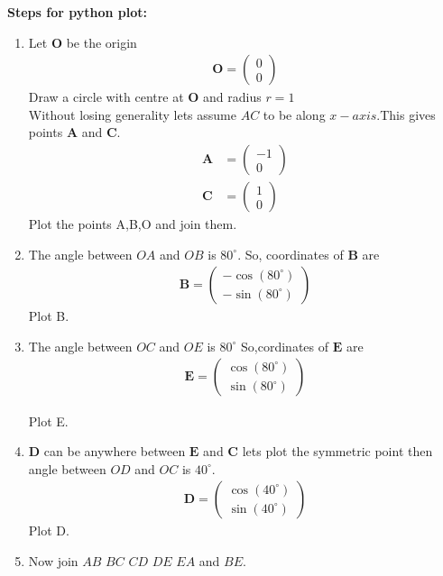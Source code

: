 \documentclass[journal,12pt,twocolumn]{IEEEtran}
\let\vec\mathbf
\newcommand{\myvec}[1]{\ensuremath{\begin{pmatrix}#1\end{pmatrix}}}
\begin{document}
\textbf{Steps for python plot:\\}
\begin{enumerate}
    \item Let $\vec{O}$ be the origin \\ 
              \begin{align}
               \vec{O}=\myvec{0\\0}
               \end{align}
               Draw a circle with centre at $\vec{O}$ and radius $r=1$\\
  Without losing generality lets assume $AC$ to be along $x-axis$.This gives points $\vec{A}$ and $\vec{C}$.
  \begin{align}
      \vec{A}&=\myvec{-1\\0}\\
      \vec{C}&=\myvec{1\\0}
  \end{align}
  Plot the points A,B,O and join them.\\
  
  \item The angle between $OA$ and $OB$ is $80^{\circ}$.
   So, coordinates of $\vec{B}$ are \\
   \begin{align}
       \vec{B}=\myvec{-\cos(80^{\circ})\\-\sin(80^{\circ})}
   \end{align}
   Plot B.
   \item The angle between $OC$ and $OE$ is $80^{\circ}$
   So,cordinates of $\vec{E}$ are
   \begin{align}
       \vec{E}=\myvec{\cos(80^{\circ})\\\sin(80^{\circ})}
   \end{align}
   
   Plot E.
   \item $\vec{D}$ can be anywhere between $\vec{E}$ and $\vec{C}$
   lets plot the symmetric point then angle between $OD$ and $OC$ is $40^{\circ}$.
   \begin{align}
       \vec{D}=\myvec{\cos(40^{\circ})\\\sin(40^{\circ})}
   \end{align}
   Plot D.\\
   \item Now join $AB$ $BC$ $CD$ $DE$ $EA$ and $BE$.\\
   

\end{enumerate}
\end{document}
